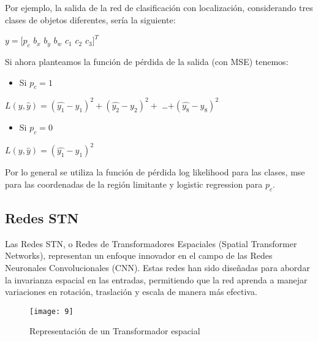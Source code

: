 	Por ejemplo, la salida de la red de clasificación con localización, considerando tres clases de objetos diferentes, sería la siguiente:
	
	\begin{center}
		\large{$y = [p_c$ $b_x$ $b_y$ $b_w$ $c_1$ $c_2$ $c_3]^T$}
	\end{center}
	
	Si ahora planteamos la función de pérdida de la salida (con MSE) tenemos:
	\vspace{0.3cm}
	\begin{itemize}[left=2cm]
	
	\item Si $p_c=1$
	\end{itemize}
	
	\begin{center}
		\large{$L(y,\hat{y}) = (\hat{y_1}-y_1)^2 + (\hat{y_2}-y_2)^2 +$ \dots $+ (\hat{y_8}-y_8)^2$}
	\end{center}	
		
	\begin{itemize}[left=2cm]
	\item Si $p_c=0$
	\end{itemize}
	
	\begin{center}
		\large{$L(y,\hat{y}) = (\hat{y_1}-y_1)^2$}
	\end{center}
	\pagebreak
	Por lo general se utiliza la función de pérdida log likelihood para las clases, mse para las coordenadas de la región limitante y logistic regression para $p_c$.

	\subsection{Redes STN}
	Las Redes STN, o Redes de Transformadores Espaciales (Spatial Transformer Networks), representan un enfoque innovador en el campo de las Redes Neuronales Convolucionales (CNN). Estas redes han sido diseñadas para abordar la invarianza espacial en las entradas, permitiendo que la red aprenda a manejar variaciones en rotación, traslación y escala de manera más efectiva.
	
	\vspace{0.3cm}
	\begin{figure}[ht]
	    \centering
		\texttt{[image: 9]}
		\caption{Representación de un Transformador espacial}
	\end{figure}
	\vspace{0.3cm}
	
